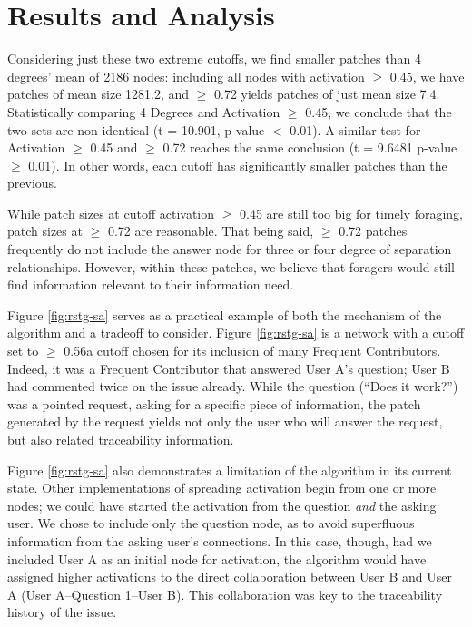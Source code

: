 \documentclass[conference]{IEEEtran}
\begin{document}
\section{Results and Analysis}
Considering just these two extreme cutoffs, we find smaller patches than 4 degrees' mean of 2186 nodes: including all nodes with activation $\geq$ 0.45, we have patches of mean size 1281.2, and $\geq$ 0.72 yields patches of just mean size 7.4. Statistically comparing 4 Degrees and Activation $\geq$ 0.45, we conclude that the two sets are non-identical (t = 10.901, p-value $<$ 0.01). A similar test for Activation $\geq$ 0.45 and $\geq$ 0.72 reaches the same conclusion (t = 9.6481 p-value $\geq$ 0.01). In other words, each cutoff has significantly smaller patches than the previous. 

While patch sizes at cutoff activation $\geq$ 0.45 are still too big for timely foraging, patch sizes at $\geq$ 0.72 are reasonable. That being said, $\geq$ 0.72 patches frequently do not include the answer node for three or four degree of separation relationships. However, within these patches, we believe that foragers would still find information relevant to their information need.

Figure \ref{fig:rstg-sa} serves as a practical example of both the mechanism of the algorithm and a tradeoff to consider. Figure \ref{fig:rstg-sa} is a network with a cutoff set to $\geq$ 0.56\textemdash a cutoff chosen for its inclusion of many Frequent Contributors. Indeed, it was a Frequent Contributor that answered User A's question; User B had commented twice on the issue already. While the question (``Does it work?'') was a pointed request, asking for a specific piece of information, the patch generated by the request yields not only the user who will answer the request, but also related traceability information. 

Figure \ref{fig:rstg-sa} also demonstrates a limitation of the algorithm in its current state. Other implementations of spreading activation begin from one or more nodes; we could have started the activation from the question \textit{and} the asking user. We chose to include only the question node, as to avoid superfluous information from the asking user's connections. In this case, though, had we included User A as an initial node for activation, the algorithm would have assigned higher activations to the direct collaboration between User B and User A (User A--Question 1--User B). This collaboration was key to the traceability history of the issue.
\end{document}
